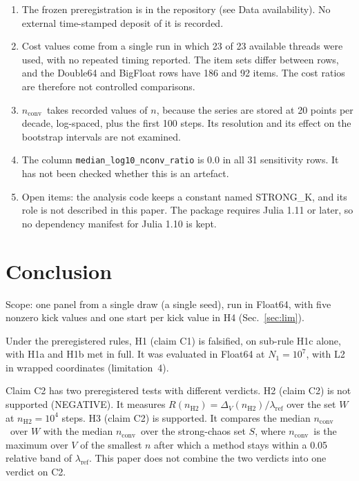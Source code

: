 \documentclass[aip,cha,reprint,amsmath,amssymb,longbibliography]{revtex4-2}
\newcommand{\tenp}[1]{\ensuremath{10^{#1}}}
\newcommand{\lref}{\ensuremath{\lambda_{\mathrm{ref}}}}
\newcommand{\nH}{\ensuremath{n_{\mathrm{H2}}}}
\newcommand{\nconv}{\ensuremath{n_{\mathrm{conv}}}}
\newcommand{\Sec}[1]{Sec.~\ref{#1}}
\begin{document}
\begin{enumerate}
The stored series are packed for deposit as a dataset on Zenodo (1363 chunk files with the manifest, the panel, the preregistration, the parameter file, the file-format description and a SHA-256 list); its DOI is 10.5281/zenodo.23534755 (Data availability section).
\item The frozen preregistration is in the repository (see Data availability).
No external time-stamped deposit of it is recorded.
\item Cost values come from a single run in which 23 of 23 available threads were used, with no repeated timing reported.
The item sets differ between rows, and the Double64 and BigFloat rows have 186 and 92 items.
The cost ratios are therefore not controlled comparisons.
\item \nconv\ takes recorded values of $n$, because the series are stored at 20 points per decade, log-spaced, plus the first 100 steps.
Its resolution and its effect on the bootstrap intervals are not examined.
\item The column \texttt{median\_log10\_nconv\_ratio} is 0.0 in all 31 sensitivity rows.
It has not been checked whether this is an artefact.
\item Open items: the analysis code keeps a constant named STRONG\_K, and its role is not described in this paper.
The package requires Julia 1.11 or later, so no dependency manifest for Julia 1.10 is kept.
\end{enumerate}

\section{Conclusion}
\label{sec:concl}

Scope: one panel from a single draw (a single seed), run in Float64, with five nonzero kick values and one start per kick value in H4 (\Sec{sec:lim}).

Under the preregistered rules, H1 (claim C1) is falsified, on sub-rule H1c alone, with H1a and H1b met in full.
It was evaluated in Float64 at $N_1=$\tenp{7}, with L2 in wrapped coordinates (limitation~4).

Claim C2 has two preregistered tests with different verdicts.
H2 (claim C2) is not supported (NEGATIVE).
It measures $R(\nH)=\Delta_V(\nH)/\lref$ over the set $W$ at $\nH=$\tenp{4} steps.
H3 (claim C2) is supported.
It compares the median \nconv\ over $W$ with the median \nconv\ over the strong-chaos set $S$, where \nconv\ is the maximum over $V$ of the smallest $n$ after which a method stays within a 0.05 relative band of $\lref$.
This paper does not combine the two verdicts into one verdict on C2.
\end{document}
